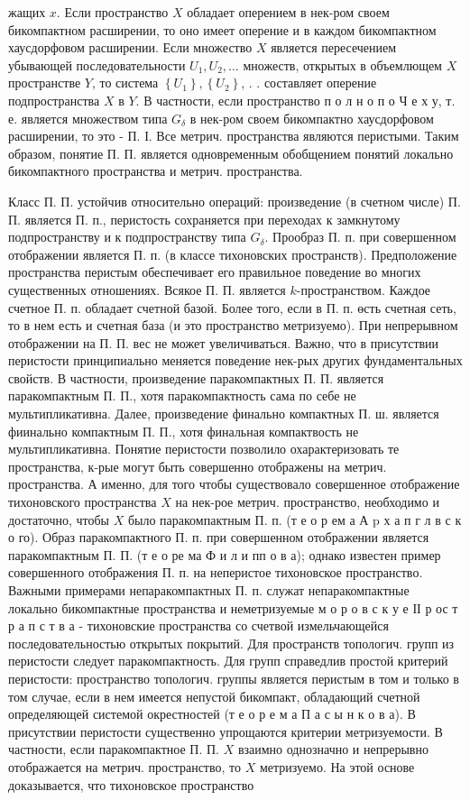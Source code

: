 \documentclass[10pt]{article}
\begin{document}
жащих $x$. Если пространство $X$ обладает оперением в нек-ром своем бикомпактном расширении, то оно имеет оперение и в каждом бикомпактном хаусдорфовом расширении. Если множество $X$ является пересечением убывающей последовательности $U_{1}, U_{2}, \ldots$ множеств, открытых в объемлющем $X$ пространстве $Y$, то система $\left\{U_{1}\right\},\left\{U_{2}\right\}$, . . составляет оперение подпространства $X$ в $Y$. В частности, если пространство п о л н о п о Ч е х у, т. е. является множеством типа $G_{\delta}$ в нек-ром своем бикомпактно хаусдорфовом расширении, то это - П. І. Все метрич. пространства являются перистыми. Таким образом, понятие П. П. является одновременным обобщением понятий локально бикомпактного пространства и метрич. пространства.



Класс П. П. устойчив относительно операций: произведение (в счетном числе) П. П. является П. п., перистость сохраняется при переходах к замкнутому подпространству и к подпространству типа $G_{\delta}$. Прообраз П. п. при совершенном отображении является П. п. (в классе тихоновских пространств). Предположение пространства перистым обеспечивает его правильное поведение во многих существенных отношениях. Всякое П. П. является $k$-пространством. Каждое счетное П. п. обладает счетной базой. Более того, если в П. п. өсть счетная сеть, то в нем есть и счетная база (и это пространство метризуемо). При непрерывном отображении на П. П. вес не может увеличиваться. Важно, что в присутствии перистости принципиально меняется поведение нек-рых других фундаментальных свойств. В частности, произведение паракомпактных П. П. является паракомпактным П. П., хотя паракомпактность сама по себе не мультипликативна. Далее, произведение финально компактных П. ш. является фиинально компактным П. П., хотя финальная компактвость не мультипликативна. Понятие перистости позволило охарактеризовать те пространства, к-рые могут быть совершенно отображены на метрич. пространства. А именно, для того чтобы существовало совершенное отображение тихоновского пространства $X$ на нек-рое метрич. пространство, необходимо и достаточно, чтобы $X$ было паракомпактным П. п. (т е о р ем а А p х а п г л в с к о го). Образ паракомпактного П. п. при совершенном отображении является паракомпактным П. П. (т е о ре ма Ф и л и пп о в а); однако известен пример совершенного отображения П. п. на неперистое тихоновское пространство. Важными примерами непаракомпактных П. п. служат непаракомпактные локально бикомпактные пространства и неметризуемые м о р о в с к у е ІІ р ос т р а п с т в а - тихоновские пространства со счетвой измельчающейся последовательностью открытых покрытий. Для пространств топологич. групп из перистости следует паракомпактность. Для групп справедлив простой критерий перистости: пространство топологич. группы является перистым в том и только в том случае, если в нем имеется непустой бикомпакт, обладающий счетной определяющей системой окрестностей (т е о р е м а П а с ы н к о в а). В присутствии перистости существенно упрощаются критерии метризуемости. В частности, если паракомпактное П. П. $X$ взаимно однозначно и непрерывно отображается на метрич. пространство, то $X$ метризуемо. На этой основе доказывается, что тихоновское пространство 
\end{document}
